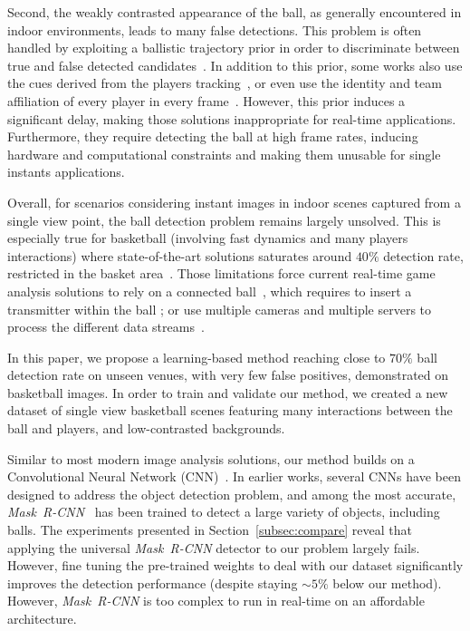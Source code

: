 \documentclass[sigconf, screen]{acmart}
\begin{document}
Second, the weakly contrasted appearance of the ball, as generally encountered in indoor environments, leads to many false detections. This problem is often handled by exploiting a ballistic trajectory prior in order to discriminate between true and false detected candidates~\cite{Chen2008, Chen2012, Chakraborty2013, Kumar2011, Zhou2013, Yan2006, Parisot2011}.
In addition to this prior, some works also use the cues derived from the players tracking~\cite{Zhang2008, Maksai2016}, or even use the identity and team affiliation of every player in every frame~\cite{Wei2016}.
However, this prior induces a significant delay, making those solutions inappropriate for real-time applications. Furthermore, they require detecting the ball at high frame rates, inducing hardware and computational constraints and making them unusable for single instants applications.

Overall, for scenarios considering instant images in indoor scenes captured from a single view point, the ball detection problem remains largely unsolved. This is especially true for basketball (involving fast dynamics and many players interactions) where state-of-the-art solutions saturates around $40\%$ detection rate, restricted in the basket area~\cite{Parisot2019b}.
Those limitations force current real-time game analysis solutions to rely on a connected ball~\cite{youtube}, which requires to insert a transmitter within the ball ; or use multiple cameras and multiple servers to process the different data streams~\cite{HawkEye, Pingali2000, intelTrueView}.

\smallskip

In this paper, we propose a learning-based method reaching close to $70\%$ ball detection rate on unseen venues, with very few false positives, demonstrated on basketball images. In order to train and validate our method, we created a new dataset of single view basketball scenes featuring many interactions between the ball and players, and low-contrasted backgrounds.

\smallskip


Similar to most modern image analysis solutions, our method builds on a Convolutional Neural Network (CNN)~\cite{Lecun2015a}.
In earlier works, several CNNs have been designed to address the object detection problem, and among the most accurate, \emph{Mask~R-CNN}~\cite{He2017} has been trained to detect a large variety of objects, including balls.
The experiments presented in Section~\ref{subsec:compare} reveal that applying the universal \emph{Mask~R-CNN} detector to our problem largely fails. However, fine tuning the pre-trained weights to deal with our dataset significantly improves the detection performance (despite staying $\sim 5\%$ below our method). However, \emph{Mask~R-CNN} is too complex to run in real-time on an affordable architecture.
\end{document}
